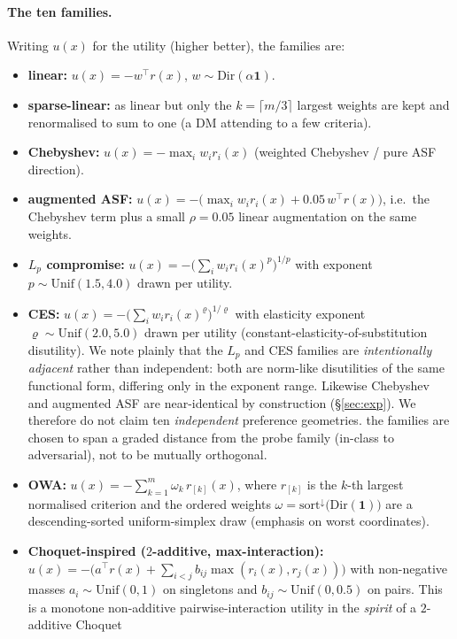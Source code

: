 \paragraph{The ten families.}
Writing $u(x)$ for the utility (higher better), the families are:
\begin{itemize}
\item \textbf{linear:} $u(x)=-w^\top r(x)$, $w\sim\mathrm{Dir}(\alpha\mathbf 1)$.
\item \textbf{sparse-linear:} as linear but only the $k=\lceil m/3\rceil$ largest
weights are kept and renormalised to sum to one (a DM attending to a few
criteria).
\item \textbf{Chebyshev:} $u(x)=-\max_i w_i r_i(x)$ (weighted Chebyshev / pure
ASF direction).
\item \textbf{augmented ASF:} $u(x)=-\bigl(\max_i w_i r_i(x)+0.05\,w^\top r(x)\bigr)$,
i.e.\ the Chebyshev term plus a small $\rho=0.05$ linear augmentation on the same
weights.
\item \textbf{$L_p$ compromise:} $u(x)=-\bigl(\sum_i w_i r_i(x)^p\bigr)^{1/p}$ with
exponent $p\sim\mathrm{Unif}(1.5,4.0)$ drawn per utility.
\item \textbf{CES:} $u(x)=-\bigl(\sum_i w_i r_i(x)^{\varrho}\bigr)^{1/\varrho}$ with
elasticity exponent $\varrho\sim\mathrm{Unif}(2.0,5.0)$ drawn per utility
(constant-elasticity-of-substitution disutility). We note plainly that the $L_p$
and CES families are \emph{intentionally adjacent} rather than independent: both
are norm-like disutilities of the same functional form, differing only in the
exponent range. Likewise Chebyshev and augmented ASF are near-identical by
construction (\S\ref{sec:exp}). We therefore do not claim ten \emph{independent}
preference geometries. the families are chosen to span a graded distance from the
probe family (in-class to adversarial), not to be mutually orthogonal.
\item \textbf{OWA:} $u(x)=-\sum_{k=1}^m \omega_k\, r_{[k]}(x)$, where $r_{[k]}$ is
the $k$-th largest normalised criterion and the ordered weights
$\omega=\mathrm{sort}^{\downarrow}\!\bigl(\mathrm{Dir}(\mathbf 1)\bigr)$ are a
descending-sorted uniform-simplex draw (emphasis on worst coordinates).
\item \textbf{Choquet-inspired ($2$-additive, max-interaction):}
$u(x)=-\bigl(a^\top r(x)+\sum_{i<j} b_{ij}\max(r_i(x),r_j(x))\bigr)$ with
non-negative masses $a_i\sim\mathrm{Unif}(0,1)$ on singletons and
$b_{ij}\sim\mathrm{Unif}(0,0.5)$ on pairs. This is a monotone non-additive
pairwise-interaction utility in the \emph{spirit} of a $2$-additive Choquet

\end{itemize}
